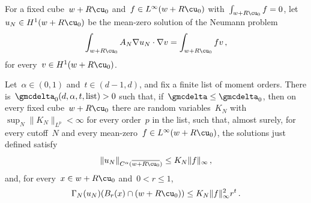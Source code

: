 \documentclass[11pt]{amsart}
\begin{document}
For a fixed cube~$w+R\cu_0$ and~$f\in L^\infty(w+R\cu_0)$ with~$\int_{w+R\cu_0}f=0$, let~$u_N\in H^1(w+R\cu_0)$ be the mean-zero solution of the Neumann problem
\begin{equation*}
	\int_{w+R\cu_0}A_N\nabla u_N\cdot\nabla v=\int_{w+R\cu_0}fv
	\,,
\end{equation*}
for every~$v\in H^1(w+R\cu_0)$.

\begin{proposition}
\label{mfd:cor-neumann-source}
Let~$\alpha\in(0,1)$ and~$t\in(d-1,d)$, and fix a finite list of moment orders. There is~$\gmcdelta_0(d,\alpha,t,\text{list})>0$ such that, if~$\gmcdelta\leq\gmcdelta_0$, then on every fixed cube~$w+R\cu_0$ there are random variables~$K_N$ with~$\sup_N\|K_N\|_{L^p}<\infty$ for every order~$p$ in the list, such that, almost surely, for every cutoff~$N$ and every mean-zero~$f\in L^\infty(w+R\cu_0)$, the solutions just defined satisfy
\begin{equation*}
	\|u_N\|_{C^\alpha(\overline{w+R\cu_0})}\leq K_N\|f\|_\infty\,,
\end{equation*}
and, for every~$x\in w+R\cu_0$ and~$0<r\leq1$,
\begin{equation*}
	\Gamma_N(u_N)(B_r(x)\cap(w+R\cu_0))\leq K_N\|f\|_\infty^2r^t\,.
\end{equation*}
\end{proposition}
\end{document}
